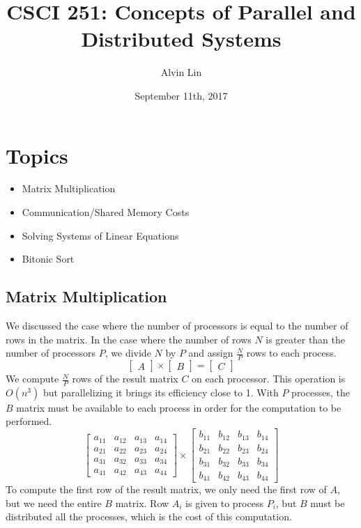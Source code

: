 \documentclass[letterpaper, 12pt]{math}
\title{CSCI 251: Concepts of Parallel and Distributed Systems}
\author{Alvin Lin}
\date{September 11th, 2017}
\begin{document}
\maketitle

\section*{Topics}
\begin{itemize}
  \item Matrix Multiplication
  \item Communication/Shared Memory Costs
  \item Solving Systems of Linear Equations
  \item Bitonic Sort
\end{itemize}

\subsection*{Matrix Multiplication}
We discussed the case where the number of processors is equal to the number of
rows in the matrix. In the case where the number of rows \( N \) is greater
than the number of processors \( P \), we divide \( N \) by \( P \) and assign
\( \frac{N}{P} \) rows to each process.
\[ \begin{bmatrix}A\end{bmatrix}\times\begin{bmatrix}B\end{bmatrix} =
  \begin{bmatrix}C\end{bmatrix} \]
We compute \( \frac{N}{P} \) rows of the result matrix \( C \) on each
processor. This operation is \( O(n^3) \) but parallelizing it brings its
efficiency close to 1. With \( P \) processes, the \( B \) matrix must be
available to each process in order for the computation to be performed.
\[ \begin{bmatrix}
  a_{11} & a_{12} & a_{13} & a_{14} \\
  a_{21} & a_{22} & a_{23} & a_{24} \\
  a_{31} & a_{32} & a_{33} & a_{34} \\
  a_{41} & a_{42} & a_{43} & a_{44}
\end{bmatrix}\times\begin{bmatrix}
  b_{11} & b_{12} & b_{13} & b_{14} \\
  b_{21} & b_{22} & b_{23} & b_{24} \\
  b_{31} & b_{32} & b_{33} & b_{34} \\
  b_{41} & b_{42} & b_{43} & b_{44}
\end{bmatrix} \]
To compute the first row of the result matrix, we only need the first row of
\( A \), but we need the entire \( B \) matrix. Row \( A_i \) is given to
process \( P_i \), but \( B \) must be distributed all the processes, which is
the cost of this computation.
\end{document}
